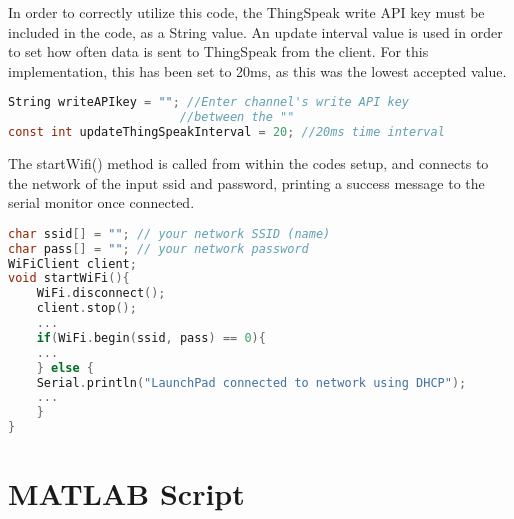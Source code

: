 \documentclass[11pt,a4paper,headinclude=false,footinclude=false]{scrreprt}
\begin{document}
In order to correctly utilize this code, the ThingSpeak write API key
must be included in the code, as a String value. An update interval
value is used in order to set how often data is sent to ThingSpeak from
the client. For this implementation, this has been set to 20ms, as this
was the lowest accepted value.

\lstset{
    caption=ThingSpeakClient.ino write API key and update interval,
    basicstyle=\footnotesize, frame=tb,
    xleftmargin=.1\textwidth, xrightmargin=.1\textwidth
}
\begin{lstlisting}[language=C]
String writeAPIkey = ""; //Enter channel's write API key
                        //between the ""
const int updateThingSpeakInterval = 20; //20ms time interval
\end{lstlisting}

The startWifi() method is called from within the codes setup, and
connects to the network of the input ssid and password, printing a
success message to the serial monitor once connected.

\lstset{
    caption=ThingSpeakClient.ino startWifi(),
    basicstyle=\footnotesize, frame=tb,
    xleftmargin=.1\textwidth, xrightmargin=.1\textwidth
}
\begin{lstlisting}[language=C]
char ssid[] = ""; // your network SSID (name)
char pass[] = ""; // your network password
WiFiClient client;
void startWiFi(){
    WiFi.disconnect();
    client.stop();
    ...
    if(WiFi.begin(ssid, pass) == 0){
    ...
    } else {
    Serial.println("LaunchPad connected to network using DHCP");
    ...
    }
}
\end{lstlisting}

\hypertarget{matlab-script}{%
\section{MATLAB Script}\label{matlab-script}}
{}

\end{document}
